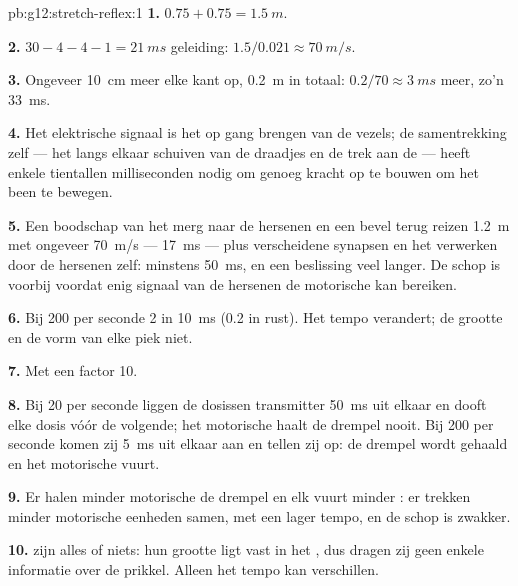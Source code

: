 \begin{solution}{pb:g12:stretch-reflex:1}
\textbf{1.} $0.75 + 0.75 = \qty{1.5}{m}$.

\textbf{2.} $30 - 4 - 4 - 1 = \qty{21}{ms}$ geleiding: $1.5/0.021
\approx \qty{70}{m/s}$.

\textbf{3.} Ongeveer \qty{10}{cm} meer elke kant op, \qty{0.2}{m} in
totaal: $0.2/70 \approx \qty{3}{ms}$ meer, zo'n \qty{33}{ms}.

\textbf{4.} Het elektrische signaal is het op gang brengen van de vezels;
de samentrekking zelf --- het langs elkaar schuiven van de draadjes en de
trek aan de  --- heeft enkele tientallen milliseconden nodig om genoeg
kracht op te bouwen om het been te bewegen.

\textbf{5.} Een boodschap van het merg naar de hersenen en een bevel terug
reizen \qty{1.2}{m} met ongeveer \qty{70}{m/s} --- \qty{17}{ms} --- plus
verscheidene synapsen en het verwerken door de hersenen zelf: minstens
\qty{50}{ms}, en een beslissing veel langer. De schop is voorbij voordat
enig signaal van de hersenen de motorische  kan bereiken.

\textbf{6.} Bij 200 per seconde 2  in \qty{10}{ms} (0.2 in
rust). Het tempo verandert; de grootte en de vorm van elke piek niet.

\textbf{7.} Met een factor 10.

\textbf{8.} Bij 20 per seconde liggen de dosissen transmitter
\qty{50}{ms} uit elkaar en dooft elke dosis vóór de volgende; het
motorische  haalt de drempel nooit. Bij 200 per seconde komen zij
\qty{5}{ms} uit elkaar aan en tellen zij op: de drempel wordt gehaald en
het motorische  vuurt.

\textbf{9.} Er halen minder motorische  de drempel en elk vuurt
minder : er trekken minder motorische eenheden samen, met
een lager tempo, en de schop is zwakker.

\textbf{10.}  zijn alles of niets: hun grootte ligt vast
in het , dus dragen zij geen enkele informatie over de prikkel.
Alleen het tempo kan verschillen.


\end{solution}
